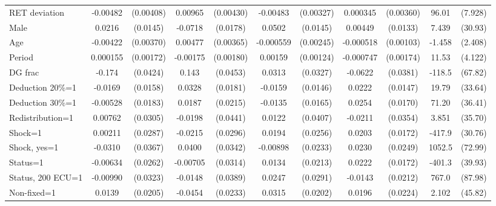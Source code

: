 \begin{tabular}{l|cccccc|cc|cc}
RET deviation   & -0.00482         &(0.00408)&  0.00965\sym{**} &(0.00430)& -0.00483         &(0.00327)& 0.000345         &(0.00360)&    96.01\sym{***}&  (7.928)\\
Male            &   0.0216         & (0.0145)&  -0.0718\sym{***}& (0.0178)&   0.0502\sym{***}& (0.0145)&  0.00449         & (0.0133)&    7.439         &  (30.93)\\
Age             & -0.00422         &(0.00370)&  0.00477         &(0.00365)&-0.000559         &(0.00245)&-0.000518         &(0.00103)&   -1.458         &  (2.408)\\
Period          & 0.000155         &(0.00172)& -0.00175         &(0.00180)&  0.00159         &(0.00124)&-0.000747         &(0.00174)&    11.53\sym{***}&  (4.122)\\
DG frac         &   -0.174\sym{***}& (0.0424)&    0.143\sym{***}& (0.0453)&   0.0313         & (0.0327)&  -0.0622         & (0.0381)&   -118.5\sym{*}  &  (67.82)\\
Deduction 20\%=1&  -0.0169         & (0.0158)&   0.0328\sym{*}  & (0.0181)&  -0.0159         & (0.0146)&   0.0222         & (0.0147)&    19.79         &  (33.64)\\
Deduction 30\%=1& -0.00528         & (0.0183)&   0.0187         & (0.0215)&  -0.0135         & (0.0165)&   0.0254         & (0.0170)&    71.20\sym{*}  &  (36.41)\\
Redistribution=1&  0.00762         & (0.0305)&  -0.0198         & (0.0441)&   0.0122         & (0.0407)&  -0.0211         & (0.0354)&    3.851         &  (35.70)\\
Shock=1         &  0.00211         & (0.0287)&  -0.0215         & (0.0296)&   0.0194         & (0.0256)&   0.0203         & (0.0172)&   -417.9\sym{***}&  (30.76)\\
Shock, yes=1    &  -0.0310         & (0.0367)&   0.0400         & (0.0342)& -0.00898         & (0.0233)&   0.0230         & (0.0249)&   1052.5\sym{***}&  (72.99)\\
Status=1        & -0.00634         & (0.0262)& -0.00705         & (0.0314)&   0.0134         & (0.0213)&   0.0222         & (0.0172)&   -401.3\sym{***}&  (39.93)\\
Status, 200 ECU=1& -0.00990         & (0.0323)&  -0.0148         & (0.0389)&   0.0247         & (0.0291)&  -0.0143         & (0.0212)&    767.0\sym{***}&  (87.98)\\
Non-fixed=1     &   0.0139         & (0.0205)&  -0.0454\sym{*}  & (0.0233)&   0.0315         & (0.0202)&   0.0196         & (0.0224)&    2.102         &  (45.82)\\

\end{tabular}
